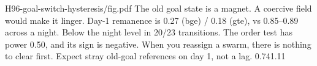 {H96-goal-switch-hysteresis/fig.pdf}
{The old goal state is a magnet. A coercive field would make it linger.}
{Day-1 remanence is 0.27 (bge) / 0.18 (gte), vs 0.85--0.89 across a night. Below the night level in 20/23 transitions. The order test has power 0.50, and its sign is negative.}
{When you reassign a swarm, there is nothing to clear first. Expect stray old-goal references on day 1, not a lag.}
{0.74}{1.11}
